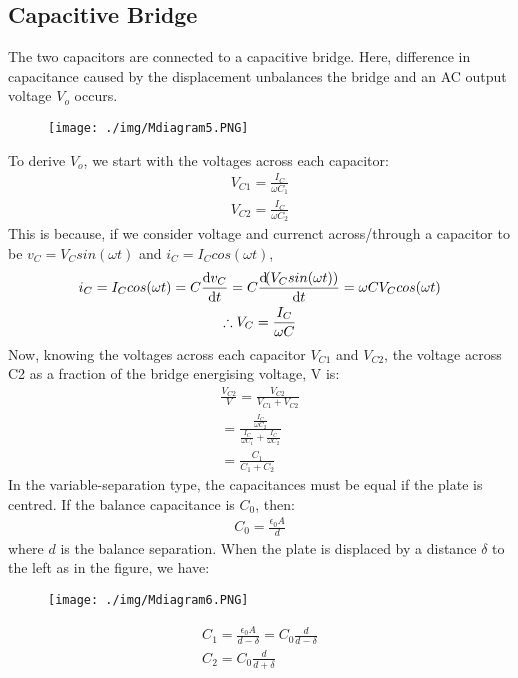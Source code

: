 \subsection{Capacitive Bridge}
The two capacitors are connected to a capacitive bridge. Here, difference in capacitance caused by the displacement unbalances the bridge and an AC output voltage $V_o$ occurs.
\begin{figure}[H]
  \centering
  \texttt{[image: ./img/Mdiagram5.PNG]}
\end{figure}
To derive $V_o$, we start with the voltages across each capacitor:
\begin{gather}
  V_{C1} = \frac{I_C}{\omega C_1} \\
  V_{C2} = \frac{I_C}{\omega C_2}
\end{gather}
This is because, if we consider voltage and currenct across/through a capacitor to be $v_C = V_Csin(\omega t)$ and $i_C = I_Ccos(\omega t)$,
\begin{gather}
  i_C = I_Ccos(\omega t) = C\frac{\dif v_C}{\dif t} = C\frac{\dif(V_Csin(\omega t))}{\dif t} = \omega CV_Ccos(\omega t) \\
  \therefore V_C = \frac{I_C}{\omega C}
\end{gather}
Now, knowing the voltages across each capacitor $V_{C1}$ and $V_{C2}$, the voltage across C2 as a fraction of the bridge energising voltage, V is:
\begin{gather}
  \frac{V_{C2}}{V} = \frac{V_{C2}}{V_{C1}+V_{C2}} \\
  = \frac{\frac{I_C}{\omega C_2}}{\frac{I_C}{\omega C_1}+\frac{I_C}{\omega C_2}} \\
  = \frac{C_1}{C_1+C_2}
\end{gather}
In the variable-separation type, the capacitances must be equal if the plate is centred. If the balance capacitance is $C_0$, then:
\begin{gather}
  C_0 = \frac{\epsilon_0A}{d}
\end{gather}
where $d$ is the balance separation. When the plate is displaced by a distance $\delta$ to the left as in the figure, we have:
\begin{figure}[H]
  \centering
  \texttt{[image: ./img/Mdiagram6.PNG]}
\end{figure}
\begin{gather}
  C_1 = \frac{\epsilon_0A}{d-\delta} = C_0\frac{d}{d-\delta} \\
  C_2 = C_0\frac{d}{d+\delta}
\end{gather}
